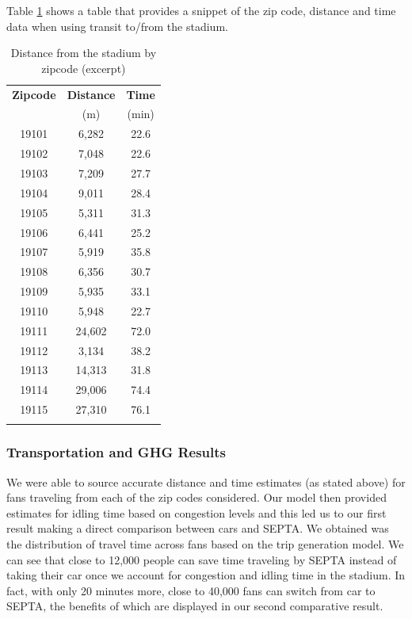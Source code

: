 Table \ref{tab-zip-dists} shows a table that provides a snippet of the
zip code, distance and time data when using transit to/from the
stadium.

\begin{table}[htp]
  \centering
  \caption{Distance from the stadium by zipcode (excerpt)}
  \label{tab-zip-dists}
  \begin{tabular}{ccc}
    \firsthline
    \bfseries Zipcode & \bfseries Distance & \bfseries Time \\
    & (m) & (min) \\ \hline
    19101 & 6,282 & 22.6 \\
    19102 & 7,048 & 22.6 \\
    19103 & 7,209 & 27.7 \\
    19104 & 9,011 & 28.4 \\
    19105 & 5,311 & 31.3 \\
    19106 & 6,441 & 25.2 \\
    19107 & 5,919 & 35.8 \\
    19108 & 6,356 & 30.7 \\
    19109 & 5,935 & 33.1 \\
    19110 & 5,948 & 22.7 \\
    19111 & 24,602 & 72.0 \\
    19112 & 3,134 & 38.2 \\
    19113 & 14,313 & 31.8 \\
    19114 & 29,006 & 74.4 \\
    19115 & 27,310 & 76.1 \\
    \lasthline
  \end{tabular}
\end{table}

\subsubsection{Transportation and GHG Results}

We were able to source accurate distance and time estimates (as stated
above) for fans traveling from each of the zip codes considered. Our
model then provided estimates for idling time based on congestion
levels and this led us to our first result making a direct comparison
between cars and SEPTA. We obtained was the distribution of travel
time across fans based on the trip generation model. We can see that
close to 12,000 people can save time traveling by SEPTA instead of
taking their car once we account for congestion and idling time in the
stadium. In fact, with only 20 minutes more, close to 40,000 fans can
switch from car to SEPTA, the benefits of which are displayed in our
second comparative result.

